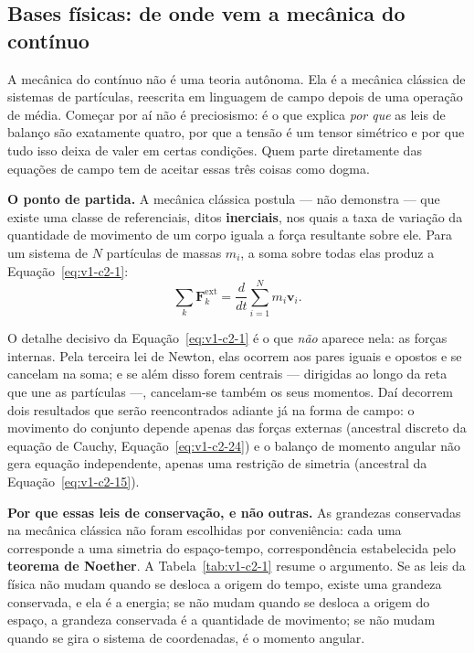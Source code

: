 \documentclass[12pt,a4paper]{article}
\numberwithin{equation}{section}
\numberwithin{table}{section}
\numberwithin{figure}{section}
\begin{document}
\subsection{Bases físicas: de onde vem a mecânica do contínuo}\label{sub:v1-c2-bases}

A mecânica do contínuo não é uma teoria autônoma. Ela é a mecânica clássica de
sistemas de partículas, reescrita em linguagem de campo depois de uma operação
de média. Começar por aí não é preciosismo: é o que explica \emph{por que} as
leis de balanço são exatamente quatro, por que a tensão é um tensor simétrico e
por que tudo isso deixa de valer em certas condições. Quem parte diretamente das
equações de campo tem de aceitar essas três coisas como dogma.

\textbf{O ponto de partida.} A mecânica clássica postula --- não demonstra ---
que existe uma classe de referenciais, ditos \textbf{inerciais}, nos quais a
taxa de variação da quantidade de movimento de um corpo iguala a força
resultante sobre ele. Para um sistema de $N$ partículas de massas $m_i$, a
soma sobre todas elas produz a Equação~\eqref{eq:v1-c2-1}:
\begin{equation}\label{eq:v1-c2-1}
\sum_k \mathbf{F}^{\text{ext}}_k =
\frac{d}{dt}\sum_{i=1}^{N} m_i \mathbf{v}_i .
\end{equation}

O detalhe decisivo da Equação~\eqref{eq:v1-c2-1} é o que \emph{não} aparece
nela: as forças internas. Pela terceira lei de Newton, elas ocorrem aos pares
iguais e opostos e se cancelam na soma; e se além disso forem centrais ---
dirigidas ao longo da reta que une as partículas ---, cancelam-se também os
seus momentos. Daí decorrem dois resultados que serão reencontrados adiante já
na forma de campo: o movimento do conjunto depende apenas das forças externas
(ancestral discreto da equação de Cauchy, Equação~\eqref{eq:v1-c2-24}) e o
balanço de momento angular não gera equação independente, apenas uma restrição
de simetria (ancestral da Equação~\eqref{eq:v1-c2-15}).

\textbf{Por que essas leis de conservação, e não outras.} As grandezas
conservadas na mecânica clássica não foram escolhidas por conveniência: cada
uma corresponde a uma simetria do espaço-tempo, correspondência estabelecida
pelo \textbf{teorema de Noether}. A Tabela~\ref{tab:v1-c2-1} resume o
argumento. Se as leis da física não mudam quando se desloca a origem do tempo,
existe uma grandeza conservada, e ela é a energia; se não mudam quando se
desloca a origem do espaço, a grandeza conservada é a quantidade de movimento;
se não mudam quando se gira o sistema de coordenadas, é o momento angular.
\end{document}
